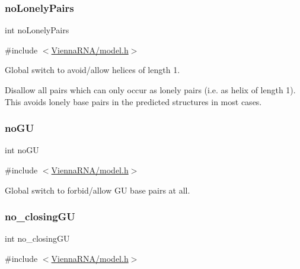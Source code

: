 \subsubsection{\texorpdfstring{no\+Lonely\+Pairs}{noLonelyPairs}}
{\footnotesize\ttfamily int no\+Lonely\+Pairs}



{\ttfamily \#include $<$\mbox{\hyperlink{model_8h}{Vienna\+R\+N\+A/model.\+h}}$>$}



Global switch to avoid/allow helices of length 1. 

Disallow all pairs which can only occur as lonely pairs (i.\+e. as helix of length 1). This avoids lonely base pairs in the predicted structures in most cases. \mbox{\label{group__model__details_gabf380d09e4f1ab94fc6af57cf0ad5d32}} 
\subsubsection{\texorpdfstring{no\+GU}{noGU}}
{\footnotesize\ttfamily int no\+GU}



{\ttfamily \#include $<$\mbox{\hyperlink{model_8h}{Vienna\+R\+N\+A/model.\+h}}$>$}



Global switch to forbid/allow GU base pairs at all. 

\mbox{\label{group__model__details_gaa8d1c7b92489179e1eafa562b7bdd259}} 
\subsubsection{\texorpdfstring{no\+\_\+closing\+GU}{no\_closingGU}}
{\footnotesize\ttfamily int no\+\_\+closing\+GU}



{\ttfamily \#include $<$\mbox{\hyperlink{model_8h}{Vienna\+R\+N\+A/model.\+h}}$>$}



